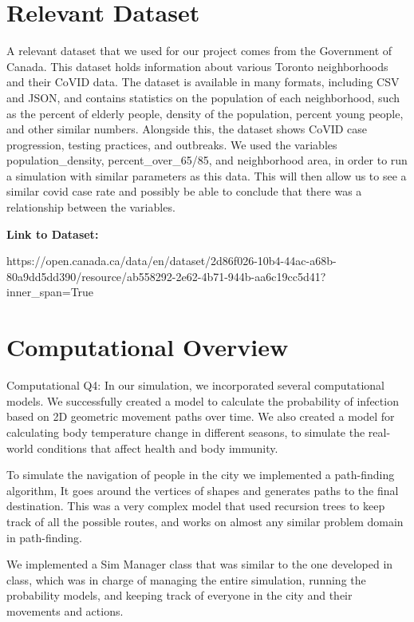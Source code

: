 \documentclass{article}
\begin{document}
\section{Relevant Dataset}

A  relevant  dataset  that we used for our  project  comes
from the Government of Canada.  This dataset holds information about various Toronto neighborhoods and their CoVID data. The dataset is available in many formats,  including  CSV  and  JSON,  and  contains  statistics  on  the  population of  each  neighborhood, such as  the  percent  of  elderly  people, density  of  the population, percent young people, and other similar numbers.  Alongside this, the  dataset  shows  CoVID  case  progression,  testing  practices,  and  outbreaks. We used the variables population\_density, percent\_over\_65/85, and neighborhood area, in order to run a simulation with similar parameters as this data. This will then allow us  to see a similar covid case rate and possibly be able to conclude that there was a relationship between the variables.


\bigskip

\textbf{Link to Dataset:} 

https://open.canada.ca/data/en/dataset/2d86f026-10b4-44ac-a68b-80a9dd5dd390/resource/ab558292-2e62-4b71-944b-aa6c19cc5d41?inner\_span=True

\bigskip


\bigskip


\section{Computational Overview}
Computational Q4:
In our simulation, we incorporated several computational models. We successfully created a model to calculate the probability of infection based on 2D geometric movement paths over time. We also created a model for calculating body temperature change in different seasons, to simulate the real-world conditions that affect health and body immunity. 

To simulate the navigation of people in the city we implemented a path-finding algorithm, It goes around the vertices of shapes and generates paths to the final destination. This was a very complex model that used recursion trees to keep track of all the possible routes, and works on almost any similar problem domain in path-finding.

We implemented a  Sim Manager class that was similar to the one developed in class, which was in charge of managing the entire simulation, running the probability models, and keeping track of everyone in the city and their movements and actions.
\end{document}

